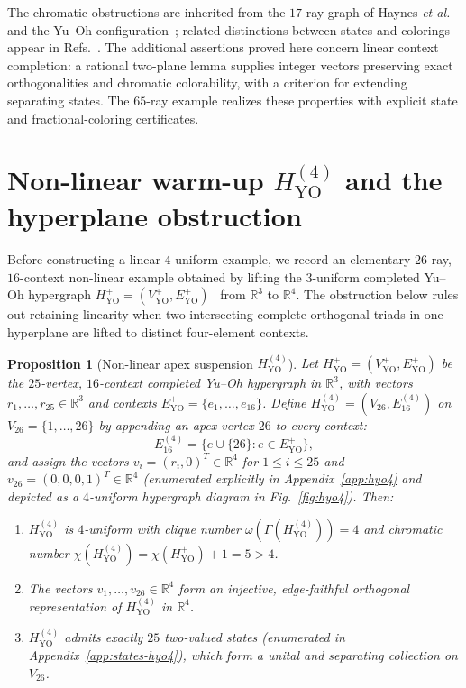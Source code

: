\documentclass[
  aps,
  pra,
  reprint,
  superscriptaddress,
  amsmath,
  amssymb,
  nofootinbib,
  floatfix
]{revtex4-2}
\newtheorem{proposition}[theorem]{Proposition}
\theoremstyle{definition}
\theoremstyle{remark}
\newcommand{\R}{\mathbb{R}}
\newcommand{\YO}{\mathrm{YO}}
\begin{document}
The chromatic obstructions are inherited from the $17$-ray graph of Haynes \emph{et al.}~\cite{haynes2010orthogonal} and the Yu--Oh configuration~\cite{Yu-2012}; related distinctions between states and colorings appear in Refs.~\cite{svozil-2021-chroma,svozil-2025-color}. The additional assertions proved here concern linear context completion: a rational two-plane lemma supplies integer vectors preserving exact orthogonalities and chromatic colorability, with a criterion for extending separating states. The $65$-ray example realizes these properties with explicit state and fractional-coloring certificates.

\section{Non-linear warm-up \texorpdfstring{$H_{\YO}^{(4)}$}{H\_YO\^(4)} and the hyperplane obstruction}

Before constructing a linear $4$-uniform example, we record an elementary $26$-ray, $16$-context non-linear example obtained by lifting the $3$-uniform completed Yu--Oh hypergraph $H_{\YO}^{+}=(V_{\YO}^{+},E_{\YO}^{+})$~\cite{Yu-2012,Pavi_i__2019,svozil-2025-color} from $\R^3$ to $\R^4$. The obstruction below rules out retaining linearity when two intersecting complete orthogonal triads in one hyperplane are lifted to distinct four-element contexts.

\begin{proposition}[Non-linear apex suspension $H_{\YO}^{(4)}$]\label{prop:warmup}
Let $H_{\YO}^{+}=(V_{\YO}^{+},E_{\YO}^{+})$ be the $25$-vertex, $16$-context completed Yu--Oh hypergraph in $\R^3$, with vectors $r_1,\ldots,r_{25}\in\R^3$ and contexts $E_{\YO}^{+}=\{e_1,\ldots,e_{16}\}$. Define $H_{\YO}^{(4)}=(V_{26},E_{16}^{(4)})$ on $V_{26}=\{1,\ldots,26\}$ by appending an apex vertex $26$ to every context:
\begin{equation}\label{eq:hyo4-def}
E_{16}^{(4)} = \bigl\{e\cup\{26\} : e\in E_{\YO}^{+}\bigr\},
\end{equation}
and assign the vectors $v_i=(r_i,0)^T\in\R^4$ for $1\le i\le 25$ and $v_{26}=(0,0,0,1)^T\in\R^4$ (enumerated explicitly in Appendix~\ref{app:hyo4} and depicted as a $4$-uniform hypergraph diagram in Fig.~\ref{fig:hyo4}). Then:
\begin{enumerate}
\item $H_{\YO}^{(4)}$ is $4$-uniform with clique number $\omega(\Gamma(H_{\YO}^{(4)}))=4$ and chromatic number $\chi(H_{\YO}^{(4)})=\chi(H_{\YO}^{+})+1=5>4$.
\item The vectors $v_1,\ldots,v_{26}\in\R^4$ form an injective, edge-faithful orthogonal representation of $H_{\YO}^{(4)}$ in $\R^4$.
\item $H_{\YO}^{(4)}$ admits exactly $25$ two-valued states (enumerated in Appendix~\ref{app:states-hyo4}), which form a unital and separating collection on $V_{26}$.
\end{enumerate}
\end{proposition}
\end{document}
